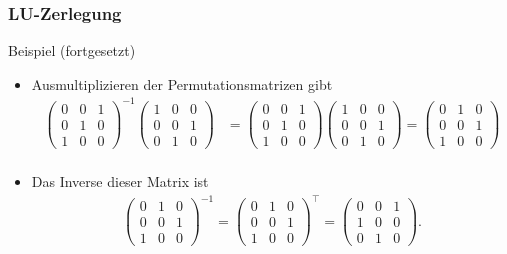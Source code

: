 \documentclass{beamer}
\newcommand{\trans}{\top}
\newcommand{\mytitle}{LU-Zerlegung}
\begin{document}
\begin{frame}\frametitle{\mytitle}
	\begin{block}{Beispiel (fortgesetzt)}
		\begin{itemize}
			\item Ausmultiplizieren der Permutationsmatrizen gibt
\begin{align*}
	\begin{pmatrix} 0&0&1\\ 0&1&0\\ 1&0&0 \end{pmatrix}^{-1}\begin{pmatrix} 1&0&0\\ 0&0&1\\0&1&0 \end{pmatrix}&=
	\begin{pmatrix} 0&0&1\\ 0&1&0\\ 1&0&0 \end{pmatrix}\begin{pmatrix} 1&0&0\\ 0&0&1\\0&1&0 \end{pmatrix}
					 =
	\begin{pmatrix} 0&1&0\\0&0&1\\1&0&0  \end{pmatrix}\\
				\end{align*}
			\item Das Inverse dieser Matrix ist
\begin{align*}
	\begin{pmatrix} 0&1&0\\0&0&1\\1&0&0  \end{pmatrix}^{-1}=
	\begin{pmatrix} 0&1&0\\0&0&1\\1&0&0  \end{pmatrix}^{\trans}=
	\begin{pmatrix} 0&0&1\\1&0&0\\0&1&0  \end{pmatrix}.
				\end{align*}
		\end{itemize}
	\end{block}
\end{frame}
\end{document}
